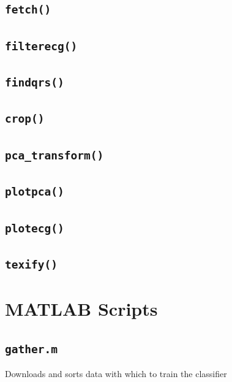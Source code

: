 \documentclass[titlepage,12pt,letter]{article}
\begin{document}
\subsection{\texttt{fetch()}}
\label{fun:fetch}


\subsection{\texttt{filterecg()}}
\label{fun:filter}


\subsection{\texttt{findqrs()}}
\label{fun:qrs}


\subsection{\texttt{crop()}}
\label{fun:crop}


\subsection{\texttt{pca\_transform()}}
\label{fun:pca}


\subsection{\texttt{plotpca()}}
\label{fun:plotpca}


\subsection{\texttt{plotecg()}}
\label{fun:plotecg}


\subsection{\texttt{texify()}}
\label{fun:tex}


\newpage
\section{MATLAB Scripts}
\subsection{\texttt{gather.m}}
\label{scr:gather}
Downloads and sorts data with which to train the classifier

\end{document}
